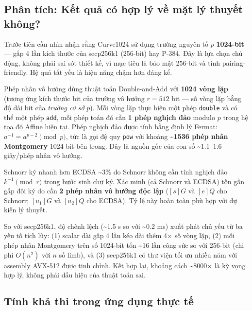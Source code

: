 \subsection{Phân tích: Kết quả có hợp lý về mặt lý thuyết
không?}\label{phuxe2n-tuxedch-kux1ebft-quux1ea3-cuxf3-hux1ee3p-luxfd-vux1ec1-mux1eb7t-luxfd-thuyux1ebft-khuxf4ng}

Trước tiên cần nhìn nhận rằng Curve1024 sử dụng trường nguyên tố \(p\)
\textbf{1024-bit} --- gấp 4 lần kích thước của secp256k1 (256-bit) hay
P-384. Đây là lựa chọn chủ động, không phải sai sót thiết kế, vì mục
tiêu là bảo mật 256-bit và tính pairing-friendly. Hệ quả tất yếu là hiệu
năng chậm hơn đáng kể.

Phép nhân vô hướng dùng thuật toán Double-and-Add với \textbf{1024 vòng
lặp} (tương ứng kích thước bit của trường vô hướng \(r = 512\) bit ---
số vòng lặp bằng độ dài bit của \emph{trường cơ sở} \(p\)). Mỗi vòng lặp
thực hiện một phép \texttt{double} và có thể một phép \texttt{add}, mỗi
phép toán đó cần \textbf{1 phép nghịch đảo} modulo \(p\) trong hệ tọa độ
Affine hiện tại. Phép nghịch đảo được tính bằng định lý Fermat:
\(a^{-1} = a^{p-2} \pmod{p}\), tức là gọi đệ quy \texttt{pow} với khoảng
\textbf{\textasciitilde1536 phép nhân Montgomery} 1024-bit bên trong.
Đây là nguồn gốc của con số \textasciitilde1.1--1.6 giây/phép nhân vô
hướng.

Schnorr ký nhanh hơn ECDSA \textasciitilde3\% do Schnorr không cần tính
nghịch đảo \(k^{-1} \pmod{r}\) trong bước sinh chữ ký. Xác minh (cả
Schnorr và ECDSA) tốn gần gấp đôi ký do cần \textbf{2 phép nhân vô hướng
độc lập} (\([s]G\) và \([e]Q\) cho Schnorr; \([u_1]G\) và \([u_2]Q\) cho
ECDSA). Tỷ lệ này hoàn toàn phù hợp với dự kiến lý thuyết.

So với secp256k1, độ chênh lệch (\textasciitilde1.5 s so với
\textasciitilde0.2 ms) xuất phát chủ yếu từ ba yếu tố tích lũy: (1)
scalar dài gấp 4 lần kéo dài thêm 4× số vòng lặp, (2) mỗi phép nhân
Montgomery trên số 1024-bit tốn \textasciitilde16 lần công sức so với
256-bit (chi phí \(O(n^2)\) với \(n\) số limb), và (3) secp256k1 có thư
viện tối ưu nhiều năm với assembly AVX-512 được tinh chỉnh. Kết hợp lại,
khoảng cách \textasciitilde8000× là kỳ vọng hợp lý, không phải dấu hiệu
của thuật toán sai.

\subsection{Tính khả thi trong ứng dụng thực
tế}\label{tuxednh-khux1ea3-thi-trong-ux1ee9ng-dux1ee5ng-thux1ef1c-tux1ebf}

